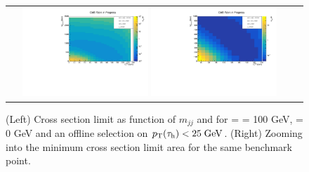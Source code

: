 \begin{figure}[tbh!]
	\centering
	\begin{tabular}{cc}
		\includegraphics[width=0.45\textwidth]{analysis/pics/JetInvMass_vs_MET_xsec_chi100_lsp000_taupt25.pdf}
		\includegraphics[width=0.45\textwidth]{analysis/pics/JetInvMass_vs_MET_xsec_chi100_lsp000_taupt25_zoom.pdf} 		
	\end{tabular}
	\caption{(Left) Cross section limit as function of $m_{jj}$ and \met for \charginopm = \neutralinotwo = 100 GeV, \neutralinoone = 0 GeV and an offline selection on $p_{\text{T}}(\tau_{\text{h}}) <  25\;\text{Ge}\kern-0.06667em\text{V}$. (Right) Zooming into the minimum cross section limit area for the same benchmark point.}
	\label{fig::JetInvMass_vs_MET_xsec_chi100_lsp000_taupt25}
\end{figure}

